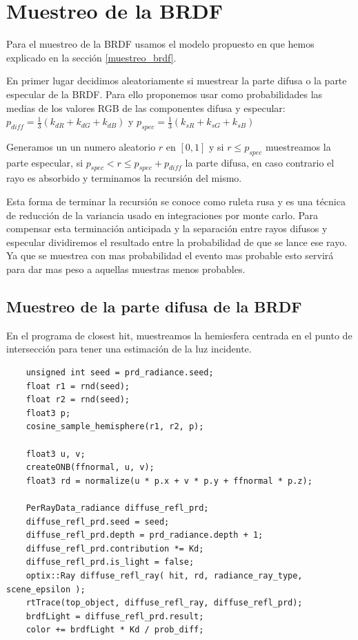 \clearpage

\section{Muestreo de la BRDF}

Para el muestreo de la BRDF usamos el modelo propuesto en \cite{Lafortune1994} que hemos explicado en la sección \ref{muestreo_brdf}.
\medskip

En primer lugar decidimos aleatoriamente si muestrear la parte difusa o la parte especular de la BRDF. Para ello proponemos usar como probabilidades las medias de los valores RGB de las componentes difusa y especular: $p_{diff} =\frac{1}{3}( k_{dR} + k_{dG} + k_{dB})$ y $p_{spec} =\frac{1}{3}( k_{sR} + k_{sG} + k_{sB})$ 

\medskip

Generamos un un numero aleatorio $r$ en $[0,1]$ y si $r \leq p_{spec}$ muestreamos la parte especular, si $p_{spec} < r \leq p_{spec} + p_{diff}$ la parte difusa, en caso contrario el rayo es absorbido y terminamos la recursión del mismo.

\medskip

Esta forma de terminar la recursión se conoce como ruleta rusa y es una técnica de reducción de la variancia usado en integraciones por monte carlo. Para compensar esta terminación anticipada y la separación entre rayos difusos y especular dividiremos el resultado entre la probabilidad de que se lance ese rayo. Ya que se muestrea con mas probabilidad el evento mas probable esto servirá para dar mas peso a aquellas muestras menos probables.

\subsection{Muestreo de la parte difusa de la BRDF}
En el programa de closest hit, muestreamos la hemiesfera centrada en el punto de intersección para tener una estimación de la luz incidente.

\begin{lstlisting}
	unsigned int seed = prd_radiance.seed;
	float r1 = rnd(seed);
	float r2 = rnd(seed);
	float3 p;
	cosine_sample_hemisphere(r1, r2, p);
	
	float3 u, v;
	createONB(ffnormal, u, v);
	float3 rd = normalize(u * p.x + v * p.y + ffnormal * p.z);
		
	PerRayData_radiance diffuse_refl_prd;
	diffuse_refl_prd.seed = seed;
	diffuse_refl_prd.depth = prd_radiance.depth + 1;
	diffuse_refl_prd.contribution *= Kd;
	diffuse_refl_prd.is_light = false;
	optix::Ray diffuse_refl_ray( hit, rd, radiance_ray_type, scene_epsilon );
	rtTrace(top_object, diffuse_refl_ray, diffuse_refl_prd);
	brdfLight = diffuse_refl_prd.result;
	color += brdfLight * Kd / prob_diff;
\end{lstlisting}

